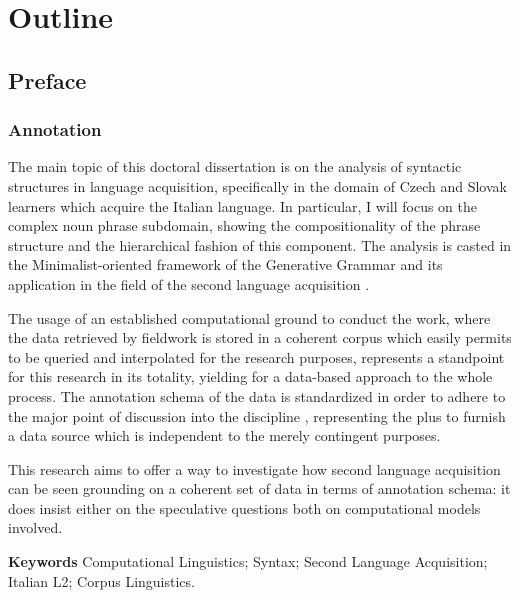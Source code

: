 \documentclass[
  a4paper,
  twoside,
  12pt,
  chapterprefix=false,
  bibliography=totocnumbered,
  listof=flat]{scrbook}
\begin{document}
{
\setcounter{tocdepth}{4}
\tableofcontents
}
\listoftables
\listoffigures
\part{Outline}

\hypertarget{preface}{%
\chapter*{Preface}\label{preface}}

\hypertarget{annotation}{%
\section*{Annotation}\label{annotation}}

The main topic of this doctoral dissertation is on the analysis of syntactic structures in language acquisition, specifically in the domain of Czech and Slovak learners which acquire the Italian language. In particular, I will focus on the complex noun phrase subdomain, showing the compositionality of the phrase structure and the hierarchical fashion of this component.
The analysis is casted in the Minimalist-oriented framework of the Generative Grammar \citep{chomsky1995, chomsky1998, chomsky2013, hcf2002} and its application in the field of the second language acquisition \citep{rothmanslabakova2017, slabakovalealliskin2014}.

The usage of an established computational ground to conduct the work, where the data retrieved by fieldwork is stored in a coherent corpus which easily permits to be queried and interpolated for the research purposes, represents a standpoint for this research in its totality, yielding for a data-based approach to the whole process.
The annotation schema of the data is standardized in order to adhere to the major point of discussion into the discipline \citep{clark2010, kueblerzinsmeinster2015, kurdi2016}, representing the plus to furnish a data source which is independent to the merely contingent purposes.

This research aims to offer a way to investigate how second language acquisition can be seen grounding on a coherent set of data in terms of annotation schema: it does insist either on the speculative questions both on computational models involved.

\textbf{Keywords}
Computational Linguistics; Syntax; Second Language Acquisition; Italian L2; Corpus Linguistics.
\end{document}
